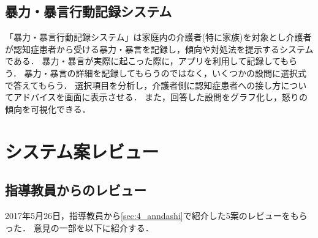 \documentclass[../report]{subfiles}
\begin{document}
\subsection{暴力・暴言行動記録システム}
「暴力・暴言行動記録システム」は家庭内の介護者(特に家族)を対象とし介護者が認知症患者から受ける暴力・暴言を記録し，傾向や対処法を提示するシステムである．
暴力・暴言が実際に起こった際に，アプリを利用して記録してもらう．
暴力・暴言の詳細を記録してもらうのではなく，いくつかの設問に選択式で答えてもらう．
選択項目を分析し，介護者側に認知症患者への接し方についてアドバイスを画面に表示させる．
また，回答した設問をグラフ化し，怒りの傾向を可視化できる．


\section{システム案レビュー} \label{sec:4_hyouka_before}
\subsection{指導教員からのレビュー}
2017年5月26日，指導教員から\ref{sec:4_anndashi}で紹介した5案のレビューをもらった．
意見の一部を以下に紹介する．
\end{document}
